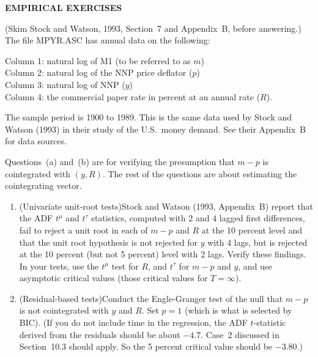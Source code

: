 
\begin{problemset}

\textbf{EMPIRICAL EXERCISES}

\medskip

(Skim Stock and Watson, 1993, Section~7 and Appendix~B, before answering.) The
file MPYR.ASC has annual data on the following:

\medskip
\noindent
Column 1: natural log of M1 (to be referred to as $m$)\\
Column 2: natural log of the NNP price deflator ($p$)\\
Column 3: natural log of NNP ($y$)\\
Column 4: the commercial paper rate in percent at an annual rate ($R$).

\medskip

The sample period is 1900 to 1989. This is the same data used by Stock and Watson
(1993) in their study of the U.S.\ money demand. See their Appendix~B for data
sources.

Questions~(a) and~(b) are for verifying the presumption that $m - p$ is cointe\-grated
with $(y, R)$. The rest of the questions are about estimating the cointegrating
vector.

\medskip

\begin{enumerate}[label=(\alph*)]
\item (Univariate unit-root tests)\quad Stock and Watson (1993, Appendix~B) report that
  the ADF $t^\mu$ and $t^\tau$ statistics, computed with 2 and 4 lagged first differences,
  fail to reject a unit root in each of $m - p$ and $R$ at the 10 percent level and that
  the unit root hypothesis is not rejected for $y$ with 4 lags, but is rejected at the
  10 percent (but not 5 percent) level with 2 lags. Verify these findings. In your
  tests, use the $t^\mu$ test for $R$, and $t^\tau$ for $m - p$ and $y$, and use asymptotic critical
  values (those critical values for $T = \infty$).

\item (Residual-based tests)\quad Conduct the Engle-Granger test of the null that $m - p$
  is not cointegrated with $y$ and $R$. Set $p = 1$ (which is what is selected by BIC).
  (If you do not include time in the regression, the ADF $t$-statistic derived from
  the residuals should be about $-4.7$. Case~2 discussed in Section~10.3 should
  apply. So the 5 percent critical value should be $-3.80$.)


\end{enumerate}
\end{problemset}
